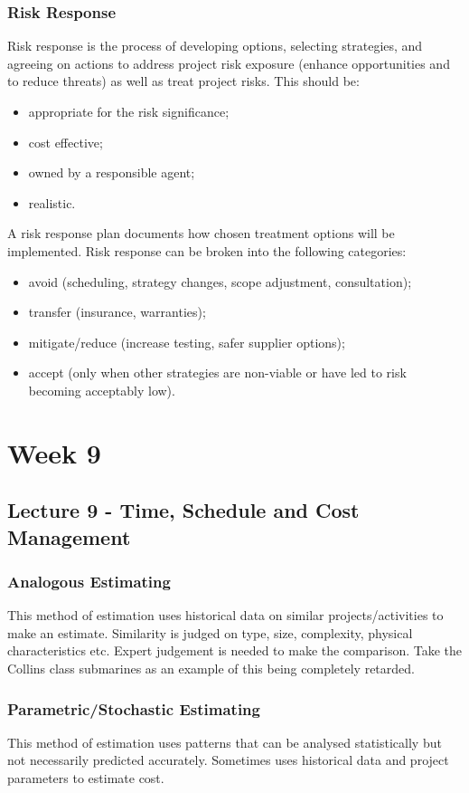 \documentclass[journal]{IEEEtran}
\begin{document}
\subsubsection{Risk Response}
Risk response is the process of developing options, selecting strategies, and agreeing on actions to address project risk exposure (enhance opportunities and to reduce threats) as well as treat project risks. This should be:
\begin{itemize}
	\item appropriate for the risk significance;
	\item cost effective;
	\item owned by a responsible agent;
	\item realistic.
\end{itemize}
A risk response plan documents how chosen treatment options will be implemented. Risk response can be broken into the following categories:
\begin{itemize}
	\item avoid (scheduling, strategy changes, scope adjustment, consultation);
	\item transfer (insurance, warranties);
	\item mitigate/reduce (increase testing, safer supplier options);
	\item accept (only when other strategies are non-viable or have led to risk becoming acceptably low).
\end{itemize}
\section{Week 9}
\subsection{\textbf{Lecture 9 - Time, Schedule and Cost Management}}
\subsubsection{Analogous Estimating}
This method of estimation uses historical data on similar projects/activities to make an estimate. Similarity is judged on type, size, complexity, physical characteristics etc. Expert judgement is needed to make the comparison. Take the Collins class submarines as an example of this being completely retarded.
\subsubsection{Parametric/Stochastic Estimating}
This method of estimation uses patterns that can be analysed statistically but not necessarily predicted accurately. Sometimes uses historical data and project parameters to estimate cost.
\end{document}
